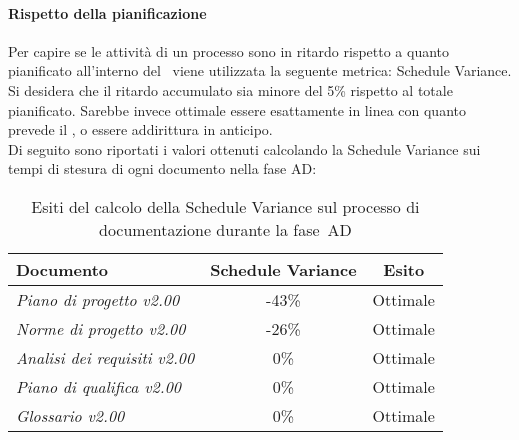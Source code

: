 \documentclass[../PianoDiQualifica.tex]{subfiles}
\begin{document}
\begin{appendices}
			\paragraph{Rispetto della pianificazione}
			Per capire se le attività di un processo sono in ritardo rispetto a quanto pianificato all’interno del \pianodiprogetto\ viene utilizzata la seguente metrica: Schedule Variance.\\
			Si desidera che il ritardo accumulato sia minore del 5\% rispetto al totale pianificato. Sarebbe invece ottimale essere esattamente in linea con quanto prevede il \pianodiprogetto, o essere addirittura in anticipo.\\
			Di seguito sono riportati i valori ottenuti calcolando la Schedule Variance sui tempi di stesura di ogni documento nella fase AD:
			\begin{table}[H]
				\centering
				\begin{tabular}{l * {2}{c}}
					\toprule
					\textbf{Documento} & \textbf{Schedule Variance} & \textbf{Esito} \\
					\midrule
					\textit{Piano di progetto v2.00} & -43\% &  Ottimale \\
					\textit{Norme di progetto v2.00} & -26\% & Ottimale \\
					\textit{Analisi dei requisiti v2.00} & 0\% & Ottimale \\
					\textit{Piano di qualifica v2.00} & 0\% & Ottimale \\
					\textit{Glossario v2.00} & 0\% & Ottimale \\
					\bottomrule
				\end{tabular}
				\caption{Esiti del calcolo della Schedule Variance sul processo di documentazione durante la fase\g\ AD}
				\label{tab:esiti_schedule_variance}
			\end{table}
			

\end{appendices}
\end{document}
